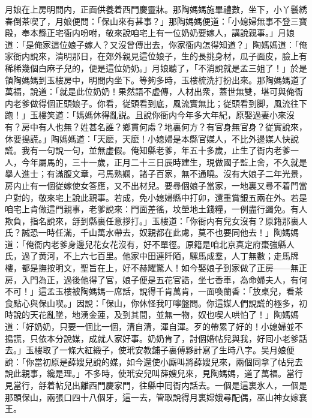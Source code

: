 月娘在上房明間内，正面供養着西門慶靈牀。那陶媽媽施畢禮數，坐下，小丫鬟綉春倒茶喫了，月娘便問：「保山來有甚事？」那陶媽媽便道：「小媳婦無事不登三寳殿，奉本縣正宅衙内吩咐，敬來說咱宅上有一位奶奶要嫁人，講說親事。」月娘道：「是俺家這位娘子嫁人？又沒曾傳出去，你家衙内怎得知道？」陶媽媽道：「俺家衙内說來，清明那日，在郊外親見這位娘子，生的長挑身材，瓜子面皮，臉上有稀稀幾個白麻子兒的，便是這位奶奶。」月娘聽了，「不消說就是孟三姐了！」於是領陶媽媽到玉樓房中，明間内坐下。等夠多時，玉樓梳洗打扮出來。那陶媽媽道了萬福，說道：「就是此位奶奶！果然語不虚傳，人材出衆，蓋世無雙，堪可與俺衙内老爹做得個正頭娘子。你看，従頭看到底，風流實無比；従頭看到脚，風流往下跑！」玉樓笑道：「媽媽休得亂説。且說你衙内今年多大年紀，原娶過妻小來沒有？房中有人也無？姓甚名誰？鄉貫何䖏？地裏何方？有官身無官身？従實說來，休要搗謊。」陶媽媽道：「天麽，天麽！小媳婦是本縣官媒人，不比外邊媒人快說謊。我有一句說一句，並無虚假。俺知縣老爹，年五十多歲，止生了衙内老爹一人，今年屬馬的，三十一歲，正月二十三日辰時建生，現做國子監上舍，不久就是擧人進士；有滿腹文章，弓馬熟嫻，諸子百家，無不通曉。沒有大娘子二年光景，房内止有一個従嫁使女答應，又不出材兒。要尋個娘子當家，一地裏又尋不着門當户對的，敬來宅上說此親事。若成，免小媳婦縣中打卯，還重賞銀五兩在外。若是咱宅上肯做這門親事，老爹說來：門面差徭，坟塋地土錢糧，一例盡行蠲免。有人欺負，指名說來，㧱到縣裏任意拶打。」玉樓道：「你衙内有兒女沒有？原籍那裏人氏？誠恐一時任滿，千山萬水帶去，奴親都在此䖏，莫不也要同他去！」陶媽媽道：「俺衙内老爹身邊兒花女花沒有，好不單徑。原籍是咱北京真定府棗強縣人氏，過了黄河，不上六七百里。他家中田連阡陌，騾馬成羣，人丁無數；走馬牌樓，都是撫按明文，聖旨在上，好不赫耀驚人！如今娶娘子到家做了正房——無正房，入門為正，過後他得了官，娘子便是五花官誥，坐七香車，為命婦夫人，有何不可！」這孟玉樓被陶媽媽一席話，說得千肯萬肯，一面喚蘭香：「放桌兒，看茶食點心與保山喫。」因說：「保山，你休怪我叮嚀盤問。你這媒人們說謊的極多，初時說的天花亂墜，地湧金蓮，及到其間，並無一物，奴也喫人哄怕了！」陶媽媽道：「好奶奶，只要一個比一個，清自清，渾自渾。歹的帶累了好的！小媳婦並不搗謊，只依本分說媒，成就人家好事。奶奶肯了，討個婚帖兒與我，好囘小老爹話去。」玉樓取了一條大紅緞子，使玳安教鋪子裏傅夥計寫了生時八字。吴月娘便說：「你當初原是薛嫂兒說的媒，如今還使小廝叫將薛嫂兒來，兩個同拿了帖兒去說此親事，纔是理。」不多時，使玳安兒叫薛嫂兒來，見陶媽媽，道了萬福。當行見當行，㧱着帖兒出離西門慶家門，往縣中囘衙内話去。一個是這裏氷人，一個是那頭保山，兩張口四十八個牙，這一去，管取說得月裏嫦娥尋配偶，巫山神女嫁襄王。

